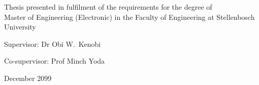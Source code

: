 \begin{titlepage}
\begin{center}

		{\large Thesis presented in fulfilment of the requirements for the degree of \\ Master of Engineering (Electronic) in the Faculty of Engineering at Stellenbosch University \par}
		
		

		\vfill
		
		{\large {Supervisor}: Dr Obi W.\ Kenobi}\par
    	{\large {Co-supervisor}: Prof Minch Yoda}

		\vfill
		{\large December 2099}
        \vfill
	\end{center}
\end{titlepage}
